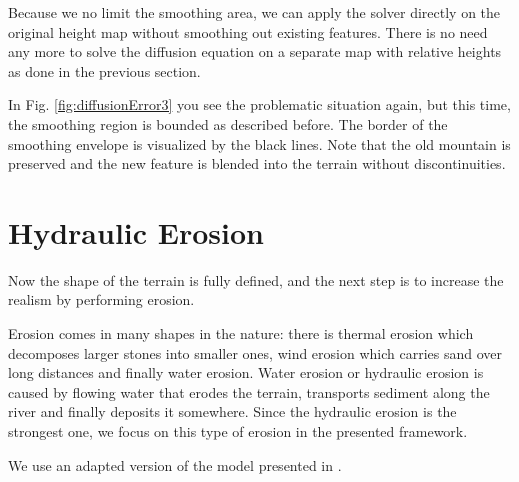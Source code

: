\documentclass[journal, letterpaper]{IEEEtran}
\begin{document}
Because we no limit the smoothing area, we can apply the solver directly on the original height map without smoothing out existing features. There is no need any more to solve the diffusion equation on a separate map with relative heights as done in the previous section.

In Fig. \ref{fig:diffusionError3} you see the problematic situation again, but this time, the smoothing region is bounded as described before. The border of the smoothing envelope is visualized by the black lines. Note that the old mountain is preserved and the new feature is blended into the terrain without discontinuities.

\section{Hydraulic Erosion}\label{HydraulicErosion}
Now the shape of the terrain is fully defined, and the next step is to increase the realism by performing erosion.

Erosion comes in many shapes in the nature: there is thermal erosion which decomposes larger stones into smaller ones, wind erosion which carries sand over long distances and finally water erosion.
Water erosion or hydraulic erosion is caused by flowing water that erodes the terrain, transports sediment along the river and finally deposits it somewhere.
Since the hydraulic erosion is the strongest one, we focus on this type of erosion in the presented framework.

We use an adapted version of the model presented in \cite{Mei.}.
\end{document}
